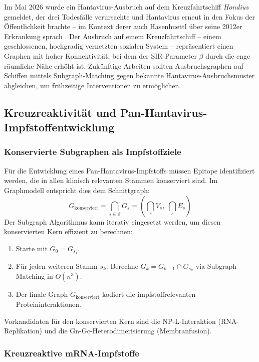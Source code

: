 ﻿\documentclass[a4paper,12pt]{article}
\theoremstyle{definition}
\begin{document}
Im Mai 2026 wurde ein Hantavirus-Ausbruch auf dem Kreuzfahrtschiff
\emph{Hondius} gemeldet, der drei Todesf\"alle verursachte und Hantavirus
erneut in den Fokus der \"Offentlichkeit brachte -- im Kontext derer auch
Hasenhuettl \"uber seine 2012er Erkrankung sprach \cite{Eurosport2026}.
Der Ausbruch auf einem Kreuzfahrtschiff -- einem geschlossenen,
hochgradig vernetzten sozialen System -- repr\"asentiert einen Graphen
mit hoher Konnektivit\"at, bei dem der SIR-Parameter $\beta$ durch die
enge r\"aumliche N\"ahe erh\"oht ist. Zuk\"unftige Arbeiten sollten
Ausbruchsgraphen auf Schiffen mittels Subgraph-Matching gegen bekannte
Hantavirus-Ausbruchsmuster abgleichen, um fr\"uhzeitige Interventionen
zu erm\"oglichen.

\subsection{Kreuzreaktivit\"at und Pan-Hantavirus-Impfstoffentwicklung}

\subsubsection{Konservierte Subgraphen als Impfstoffziele}

F\"ur die Entwicklung eines Pan-Hantavirus-Impfstoffs m\"ussen
Epitope identifiziert werden, die in allen klinisch relevanten St\"ammen
konserviert sind. Im Graphmodell entspricht dies dem Schnittgraph:
\[
    G_{\mathrm{konserviert}} = \bigcap_{s \in \mathcal{S}} G_s =
    \left(\bigcap_s V_s,\; \bigcap_s E_s\right)
\]
Der Subgraph Algorithmus kann iterativ eingesetzt werden, um diesen
konservierten Kern effizient zu berechnen:
\begin{enumerate}
    \item Starte mit $G_0 = G_{s_1}$.
    \item F\"ur jeden weiteren Stamm $s_k$: Berechne $G_{k} = G_{k-1} \cap G_{s_k}$
          via Subgraph-Matching in $O(n^3)$.
    \item Der finale Graph $G_{\mathrm{konserviert}}$ kodiert die impfstoffrelevanten
          Proteininteraktionen.
\end{enumerate}
Vorkandidaten f\"ur den konservierten Kern sind die NP-L-Interaktion
(RNA-Replikation) und die Gn-Gc-Heterodimerisierung (Membranfusion).

\subsubsection{Kreuzreaktive mRNA-Impfstoffe}
\end{document}
